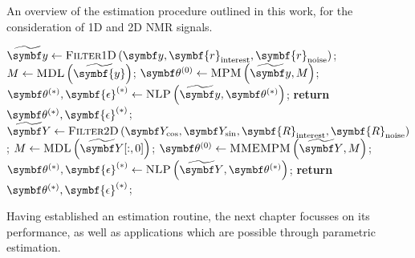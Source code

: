 \begin{algorithm}
    \begin{algorithmic}[1]
        \caption[
            An overview of the estimation procedure outlined in this work.
        ]{
            An overview of the estimation procedure outlined in this work, for
            the consideration of \ac{1D} and \ac{2D} \ac{NMR} signals.
        }
        \label{alg:1d-2d-summary}
            \State $\widetilde{\by} \gets \textsc{Filter}1\textsc{D}\left(
                \by,
                \symbf{r}_{\text{interest}},
                \symbf{r}_{\text{noise}}
                \right)
            $;
                \State $M \gets \textsc{MDL}\left(\widetilde{\symbf{y}}\right)$;
            \EndIf
            \State $\bthzero \gets \textsc{MPM}\left(\widetilde{\by}, M\right)$;
            \State $\bthstar, \symbf{\epsilon}^{(*)} \gets \textsc{NLP}\left(\widetilde{\by}, \bthstar\right)$;
            \State \textbf{return} $\bthstar, \symbf{\epsilon}^{(*)}$;
        \EndProcedure
        \Statex
            \State $\widetilde{\bY} \gets \textsc{Filter}2\textsc{D}\left(
                \bY_{\cos},
                \bY_{\sin},
                \symbf{R}_{\text{interest}},
                \symbf{R}_{\text{noise}}
                \right)
            $;
                \State $M \gets \textsc{MDL}\left(\widetilde{\bY}[:, 0]\right)$;
            \EndIf
            \State $\bthzero \gets \textsc{MMEMPM}\left(\widetilde{\bY}, M\right)$;
            \State $\bthstar, \symbf{\epsilon}^{(*)} \gets \textsc{NLP}\left(\widetilde{\bY}, \bthstar\right)$;
            \State \textbf{return} $\bthstar, \symbf{\epsilon}^{(*)}$;
        \EndProcedure
    \end{algorithmic}
\end{algorithm}

Having established an estimation routine, the next chapter focusses on its
performance, as well as applications which are possible through parametric
estimation.
